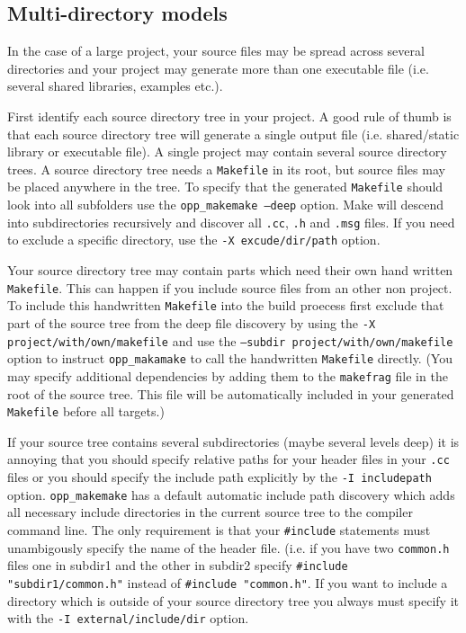 \subsection{Multi-directory models}

In the case of a large project, your source files may be spread across
several directories and your project may generate more than one executable
file (i.e. several shared libraries, examples etc.).

First identify each source directory tree in your project. A good rule of
thumb is that each source directory tree will generate a single output file
(i.e. shared/static library or executable file). A single project may contain
several source directory trees. A source directory tree needs
a \texttt{Makefile} in its root, but source files may be placed anywhere
in the tree. To specify that the generated \texttt{Makefile} should look into all
subfolders use the \texttt{opp\_makemake --deep} option. Make will descend into
subdirectories recursively and discover all \texttt{.cc}, \texttt{.h} and \texttt{.msg}
files. If you need to exclude a specific directory, use the \texttt{-X excude/dir/path}
option.

Your source directory tree may contain parts which need their own hand written \texttt{Makefile}.
This can happen if you include source files from an other non {\opp} project. To
include this handwritten \texttt{Makefile} into the build proecess first exclude that part
of the source tree from the deep file discovery by using the \texttt{-X project/with/own/makefile}
and use the \texttt{--subdir project/with/own/makefile} option to instruct \texttt{opp\_makamake}
to call the handwritten \texttt{Makefile} directly. (You may specify additional dependencies by
adding them to the \texttt{makefrag} file in the root of the source tree. This file will be
automatically included in your generated \texttt{Makefile} before all targets.)

If your source tree contains several subdirectories (maybe several levels deep) it is
annoying that you should specify relative paths for your header files in your \texttt{.cc} files
or you should specify the include path explicitly by the \texttt{-I includepath} option.
\texttt{opp\_makemake} has a default automatic include path discovery which adds all necessary
include directories in the current source tree to the compiler command line. The only requirement is
that your \texttt{\#include} statements must unambigously specify the name of the header file.
(i.e. if you have two \texttt{common.h} files one in subdir1 and the other in subdir2 specify
\texttt{\#include "subdir1/common.h"} instead of \texttt{\#include "common.h"}. If you want to
include a directory which is outside of your source directory tree you always must specify it with
the \texttt{-I external/include/dir} option.

